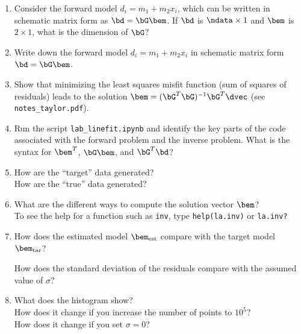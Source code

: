 \documentclass[11pt,titlepage,fleqn]{article}
\begin{document}
\begin{enumerate}
\item Consider the forward model $d_i = m_1 + m_2 x_i$, which can be written in schematic matrix form as $\bd = \bG\bem$. If $\bd$ is $\ndata \times 1$ and $\bem$ is $2 \times 1$, what is the dimension of $\bG$?

\vertgap

\item Write down the forward model $d_i = m_1 + m_2 x_i$ in schematic matrix form $\bd = \bG\bem$.

\vertgap
\vertgap
\vertgap
\vertgap
\vertgap
\vertgap


\item Show that minimizing the least squares misfit function (\ie sum of squares of residuals) leads to the solution $\bem = (\bG^T\bG)^{-1}\bG^T\dvec$ (see \verb+notes_taylor.pdf+).

\pagebreak
\item Run the script \verb+lab_linefit.ipynb+ and identify the key parts of the code associated with the forward problem and the inverse problem. What is the syntax for $\bem^T$, $\bG\bem$, and $\bG^T\bd$?

\vertgap

\item How are the ``target'' data generated? \\
How are the ``true'' data generated?


\vertgap

\item What are the different ways to compute the solution vector $\bem$? \\
To see the help for a function such as \verb+inv+, type \verb+help(la.inv)+ or \verb+la.inv?+

\vertgap

\item How does the estimated model $\bem_{\rm est}$ compare with the target model $\bem_{\rm tar}$?

\vertgap

How does the standard deviation of the residuals compare with the assumed value of $\sigma$?

\vertgap

\item What does the histogram show? \\
How does it change if you increase the number of points to $10^5$? \\
How does it change if you set $\sigma = 0$?


\end{enumerate}
\end{document}
